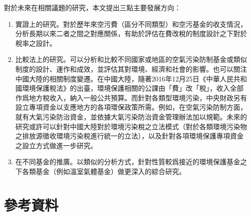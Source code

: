 \documentclass[12pt,a4paper]{article}
\begin{document}
對於未來在相關議題的研究，本文提出三點主要發展方向：
\begin{enumerate}
  \item 實證上的研究。對於歷年來空污費（區分不同類型）和空污基金的收支情況，分析長期以來二者之間之對應關係，有助於評估在費改稅的制度設計之下對於稅率之設計。
  \item 比較法上的研究。可以分析和比較不同國家或地區的空氣污染防制基金或類似制度的設計、運作和成效，並評估其對環境、經濟和社會的影響。也可以關注中國大陸的相關制度變遷。在中國大陸，隨著2016年12月25日《中華人民共和國環境保護稅法》的出臺，環境保護相關的公課由「費」改「稅」，收入全部作爲地方稅收入，納入一般公共預算。而針對各類型環境污染，中央財政另有設立專項資金以支應地方的各項環保政策所需。例如，在空氣污染防制方面，就有大氣污染防治資金，並依據大氣污染防治資金管理辦法加以規範。未來的研究或許可以針對中國大陸對於環境污染稅之立法模式（對於各類環境污染物之排放源徵收環境污染稅進行統一的立法），以及針對各項環境保護專項資金之設立方式做進一步研究。
  \item 在不同基金的推廣。以類似的分析方式，針對性質較爲接近的環境保護基金之下各類基金（例如溫室氣體基金）做更深入的綜合研究。
\end{enumerate}

\pagebreak
\nocite{*}




\section*{參考資料}



\printbibliography[type=book, title={專書}]

\printbibliography[type=article, title={期刊文章}]

\printbibliography[type=thesis,title={學位論文}]



\printbibliography[
  nottype=book,
  nottype = incollection, 
  nottype=article,
  nottype=thesis,
  title={網路資料}]
\end{document}
